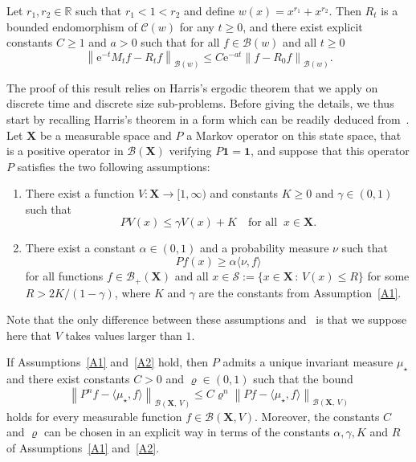 \documentclass[AHL,Unicode,longabstracts,published]{cedram}
\renewcommand{\leq}{\leqslant}
\renewcommand{\geq}{\geqslant}
\newcommand{\Cr}{\mathcal{C}}
\newcommand{\B}{\mathcal{B}}
\newcommand{\Scal}{\mathcal{S}}
\newcommand{\R}{\mathbb{R}}
\newcommand{\1}{\mathds{1}}
\newcommand{\X}{\mathbf{X}}
\newcommand{\bfun}{\mathbf{1}}
\newcommand{\e}{\mathrm{e}}
\newcommand*{\Aenumi}{\renewcommand*{\theenumi}{A\arabic{enumi}}}
\begin{document}
\begin{theo}\label{thm:conv_norm}
Let $r_1,r_2\in\R$ such that $r_1<1<r_2$ and define $w(x)=x^{r_1}+x^{r_2}$. Then $R_t$ is a bounded endomorphism of $\Cr(w)$ for any $t\geq0$, and there exist explicit constants $C\geq1$ and $a>0$ such that for all $f\in\B(w)$ and all $t\geq0$
\[
\left\|\e^{-t}M_tf-R_tf\right\|_{\B(w)}\leq C\e^{-at}\left\|f-R_0f\right\|_{\B(w)}.
\]
\end{theo}

The proof of this result relies on Harris's ergodic theorem that we apply on discrete time and discrete size sub-problems. Before giving the details, we thus start by recalling Harris's theorem in a form which can be readily deduced from~\cite[Theorem~1.3]{HairerMattingly}. Let $\X$ be a measurable space and $P$ a Markov operator on this state space, that is a positive operator in $\B(\X)$ verifying $P\bfun=\bfun$, and suppose that this operator $P$ satisfies the two following assumptions:
\begin{enumerate}\Aenumi
\item\label{A1} There exist a function $V:\X\to[1,\infty)$ and constants $K\geq0$ and $\gamma\in(0,1)$ such that
\[
PV(x)\leq\gamma V(x)+K \quad\text{for all}\;\;x\in\X.
\]
\item\label{A2} There exist a constant $\alpha\in(0,1)$ and a probability measure $\nu$ such that
\[
Pf(x)\geq \alpha\langle\nu,f\rangle
\]
for all functions $f\in\B_+(\X)$ and all $x\in\Scal :=\{x\in\X\,:\,V(x)\leq R\}$ for some $R>2K/(1-\gamma)$, where $K$ and $\gamma$ are the constants from Assumption~\eqref{A1}.
\end{enumerate}
Note that the only difference between these assumptions and~\cite[Assumption~1 and Assumption~2]{HairerMattingly} is that we suppose here that $V$ takes values larger than $1$.

\begin{theo}\label{thm:HM}
If Assumptions~\eqref{A1} and~\eqref{A2} hold, then $P$ admits a unique invariant measure $\mu_\star$ and there exist constants $C>0$ and $\varrho\in(0,1)$ such that the bound
\[
\left\| P^nf-\langle\mu_\star,f\rangle\right\|_{\B(\X,\,V)}\leq C\varrho^n\left\| P f-\langle\mu_\star,f\rangle\right\|_{\B(\X,\,V)}
\]
holds for every measurable function $f\in\B(\X,V)$. Moreover, the constants $C$ and $\varrho$ can be chosen in an explicit way in terms of the constants $\alpha,\gamma,K$ and $R$ of Assumptions~\eqref{A1} and~\eqref{A2}.
\end{theo}
\end{document}
